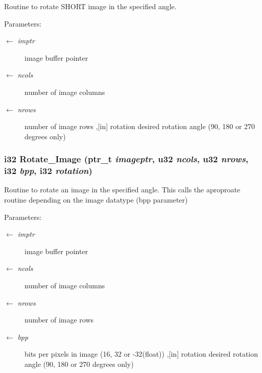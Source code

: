 Routine to rotate SHORT image in the specified angle. \begin{Desc}
\item[Parameters:]
\begin{description}
\item[\mbox{$\leftarrow$} {\em imptr}]image buffer pointer \item[\mbox{$\leftarrow$} {\em ncols}]number of image columns \item[\mbox{$\leftarrow$} {\em nrows}]number of image rows ,[in] rotation desired rotation angle (90, 180 or 270 degrees only) \end{description}
\end{Desc}
\subsubsection{\setlength{\rightskip}{0pt plus 5cm}i32 Rotate\_\-Image (ptr\_\-t {\em imageptr}, u32 {\em ncols}, u32 {\em nrows}, i32 {\em bpp}, i32 {\em rotation})}\label{GU__transformations_8h_4f3146b6980c53fdb4f0c2c7aaf03d39}


Routine to rotate an image in the specified angle. This calls the aproproate routine depending on the image datatype (bpp parameter) \begin{Desc}
\item[Parameters:]
\begin{description}
\item[\mbox{$\leftarrow$} {\em imptr}]image buffer pointer \item[\mbox{$\leftarrow$} {\em ncols}]number of image columns \item[\mbox{$\leftarrow$} {\em nrows}]number of image rows \item[\mbox{$\leftarrow$} {\em bpp}]bits per pixels in image (16, 32 or -32(float)) ,[in] rotation desired rotation angle (90, 180 or 270 degrees only) \end{description}
\end{Desc}
